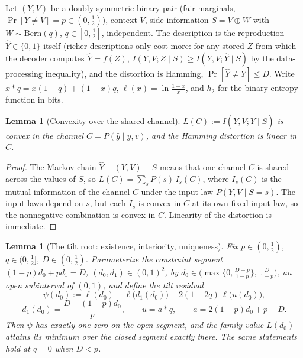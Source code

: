 ﻿\documentclass[11pt,onecolumn]{IEEEtran}
\newtheorem{lemma}[theorem]{Lemma}
\newcommand{\hY}{\widehat{Y}}
\begin{document}
Let $(Y,V)$ be a doubly symmetric binary pair (fair marginals,
$\Pr[Y\ne V]=p\in(0,\tfrac12)$), context $V$, side information
$S=V\oplus W$ with $W\sim\mathrm{Bern}(q)$, $q\in[0,\tfrac12]$,
independent. The description is the reproduction $\hY\in\{0,1\}$ itself
(richer descriptions only cost more: for any stored $Z$ from which the
decoder computes $\hY=f(Z)$, $I(Y,V;Z\mid S)\ge I(Y,V;\hY\mid S)$
by the data-processing inequality), and the distortion is Hamming,
$\Pr[\hY\ne Y]\le D$. Write $x*q=x(1-q)+(1-x)q$,
$\ell(x)=\ln\frac{1-x}{x}$, and $h_2$ for the binary entropy function
in bits.

\begin{lemma}[Convexity over the shared channel]\label{lem:binconvex}
$L(C):=I(Y,V;\hY\mid S)$ is convex in the channel
$C=P(\hat y\mid y,v)$, and the Hamming distortion is linear in $C$.
\end{lemma}

\begin{proof}
The Markov chain $\hY-(Y,V)-S$ means that one channel $C$ is shared
across the values of $S$, so $L(C)=\sum_sP(s)\,I_s(C)$, where $I_s(C)$
is the mutual information of the channel $C$ under the input law
$P(Y,V\mid S=s)$. The input laws depend on $s$, but each $I_s$ is
convex in $C$ at its own fixed input law, so the nonnegative
combination is convex in $C$. Linearity of the distortion is immediate.
\end{proof}

\begin{lemma}[The tilt root: existence, interiority, uniqueness]
\label{lem:tiltroot}
Fix $p\in(0,\tfrac12)$, $q\in(0,\tfrac12]$, $D\in(0,\tfrac12)$.
Parameterize the constraint segment $(1-p)d_0+pd_1=D$,
$(d_0,d_1)\in(0,1)^2$, by
$d_0\in\bigl(\max\{0,\tfrac{D-p}{1-p}\},\ \tfrac{D}{1-p}\bigr)$, an
open subinterval of $(0,1)$, and define the tilt residual
\[
\psi(d_0):=\ell(d_0)-\ell\bigl(d_1(d_0)\bigr)
-2(1-2q)\,\ell\bigl(u(d_0)\bigr),
\]
\[
d_1(d_0)=\frac{D-(1-p)d_0}{p},\qquad
u=a*q,\qquad a=2(1-p)d_0+p-D .
\]
Then $\psi$ has exactly one zero on the open segment, and the family
value $L(d_0)$ attains its minimum over the closed segment exactly
there. The same statements hold at $q=0$ when $D<p$.
\end{lemma}
\end{document}
